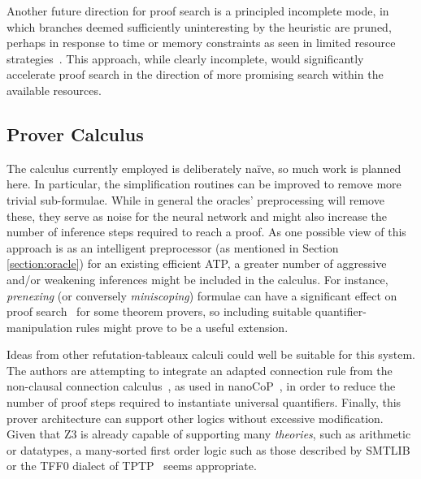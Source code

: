 \documentclass[runningheads]{llncs}
\newcommand{\z}[1]{\textsc{Z3}}
\begin{document}
Another future direction for proof search is a principled incomplete mode, in which branches deemed sufficiently uninteresting by the heuristic are pruned, perhaps in response to time or memory constraints as seen in limited resource strategies~\cite{LRS}.
This approach, while clearly incomplete, would significantly accelerate proof search in the direction of more promising search within the available resources.

\subsection{Prover Calculus}
The calculus currently employed is deliberately na\"ive, so much work is planned here.
In particular, the simplification routines can be improved to remove more trivial sub-formulae.
While in general the oracles' preprocessing will remove these, they serve as noise for the neural network and might also increase the number of inference steps required to reach a proof.
As one possible view of this approach is as an intelligent preprocessor (as mentioned in Section \ref{section:oracle}) for an existing efficient ATP, a greater number of aggressive and/or weakening inferences might be included in the calculus.
For instance, \emph{prenexing} (or conversely \emph{miniscoping}) formulae can have a significant effect on proof search~\cite{clausification} for some theorem provers, so including suitable quantifier-manipulation rules might prove to be a useful extension.

Ideas from other refutation-tableaux calculi could well be suitable for this system.
The authors are attempting to integrate an adapted connection rule from the non-clausal connection calculus~\cite{non-clausal-connections}, as used in nanoCoP~\cite{nanocop}, in order to reduce the number of proof steps required to instantiate universal quantifiers.
Finally, this prover architecture can support other logics without excessive modification.
Given that \z3 is already capable of supporting many \emph{theories}, such as arithmetic or datatypes, a many-sorted first order logic such as those described by SMTLIB~\cite{smtlib} or the TFF0 dialect of TPTP~\cite{tff0} seems appropriate.
\end{document}
